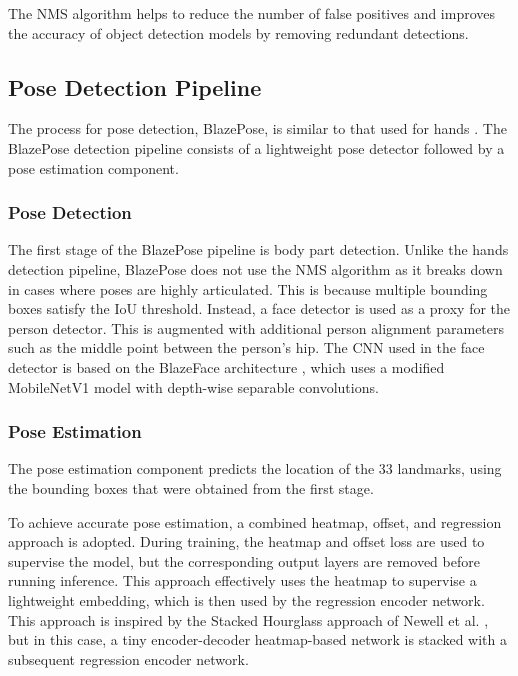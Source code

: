 \documentclass[final,dissertation.tex]{subfiles}
\begin{document}
The NMS algorithm helps to reduce the number of false positives and improves the accuracy of object detection models by removing redundant detections.

\subsection{Pose Detection Pipeline}

The process for pose detection, BlazePose, is similar to that used for hands \cite{bazarevsky2020blazepose}. The BlazePose detection pipeline consists of a lightweight pose detector followed by a pose estimation component.

\subsubsection{Pose Detection}

The first stage of the BlazePose pipeline is body part detection. Unlike the hands detection pipeline, BlazePose does not use the NMS algorithm as it breaks down in cases where poses are highly articulated. This is because multiple bounding boxes satisfy the IoU threshold. Instead, a face detector is used as a proxy for the person detector. This is augmented with additional person alignment parameters such as the middle point between the person's hip. The CNN used in the face detector is based on the BlazeFace architecture \cite{bazarevsky2019blazeface}, which uses a modified MobileNetV1 model with depth-wise separable convolutions.

\subsubsection{Pose Estimation}

The pose estimation component predicts the location of the 33 landmarks, using the bounding boxes that were obtained from the first stage.

To achieve accurate pose estimation, a combined heatmap, offset, and regression approach is adopted. During training, the heatmap and offset loss are used to supervise the model, but the corresponding output layers are removed before running inference. This approach effectively uses the heatmap to supervise a lightweight embedding, which is then used by the regression encoder network. This approach is inspired by the Stacked Hourglass approach of Newell et al. \cite{newell2016stacked}, but in this case, a tiny encoder-decoder heatmap-based network is stacked with a subsequent regression encoder network.
\end{document}
